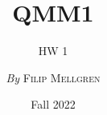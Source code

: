 

\title{QMM1}
\subtitle{HW 1}
\author{\textit{By} \textsc{Filip Mellgren}}
\date{Fall 2022}


	
	\maketitle
	
	
	
	


